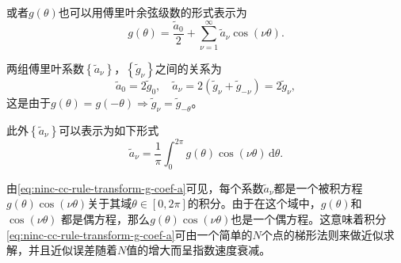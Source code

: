或者$g(\theta)$也可以用傅里叶余弦级数的形式表示为
\begin{equation}
  \label{eq:ninc-cc-rule-transform-g-fseries-cos}
  g(\theta) = \frac{\tilde{a}_{0}}{2} +
  \sum_{\nu = 1}^{\infty} \tilde{a}_{\nu} \cos \left( \nu \theta \right).
\end{equation}

两组傅里叶系数$\left\{ \tilde{a}_{\nu} \right\}$，$\left\{ \tilde{g}_{\nu} \right\}$之间的关系为
\begin{equation}
  \label{eq:ninc-cc-rule-transform-g-fseries-relation}
  \tilde{a}_{0} = 2 \tilde{g}_{0}, \quad \tilde{a}_{\nu} = 2 \left( \tilde{g}_{\nu} + \tilde{g}_{- \nu} \right) = 2 \tilde{g}_{\nu},
\end{equation}
这是由于$g(\theta)=g(-\theta) \Rightarrow \tilde{g}_{\nu} = \tilde{g}_{-\theta}$。

此外$\left\{ \tilde{a}_{\nu} \right\}$可以表示为如下形式
\begin{equation}
  \label{eq:ninc-cc-rule-transform-g-coef-a}
  \tilde{a}_{\nu} = \frac{1}{\pi} \int_{0}^{2 \pi} g(\theta) \cos \left( \nu \theta \right) \, \mathrm{d} \theta.
\end{equation}

由\eqref{eq:ninc-cc-rule-transform-g-coef-a}可见，每个系数$\tilde{a}_{\nu}$都是一个被积方程$g(\theta) \cos \left( \nu \theta \right)$关于其域$\theta \in [0, 2 \pi]$的积分。由于在这个域中，$g(\theta)$和$\cos \left( \nu \theta \right)$
都是偶方程，那么$g(\theta) \cos \left( \nu \theta \right)$也是一个偶方程。这意味着积分\eqref{eq:ninc-cc-rule-transform-g-coef-a}可由一个简单的$N$个点的梯形法则来做近似求解，并且近似误差随着$N$值的增大而呈指数速度衰减。

